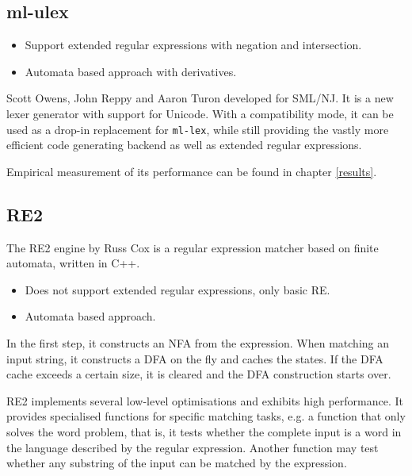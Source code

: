 \subsection{ml-ulex}

\begin{itemize}

   \item Support extended regular expressions with negation and intersection.

   \item Automata based approach with derivatives.

\end{itemize}

Scott Owens, John Reppy and Aaron Turon developed \mlulex{} for SML/NJ. It is a
new lexer generator with support for Unicode. With a compatibility mode, it can
be used as a drop-in replacement for \texttt{ml-lex}, while still providing the
vastly more efficient code generating backend as well as extended regular
expressions.

Empirical measurement of its performance can be found in chapter \ref{results}.


\subsection{RE2}

The RE2 engine by Russ Cox is a regular expression matcher based on finite
automata, written in C++.

\begin{itemize}

   \item Does not support extended regular expressions, only basic RE.

   \item Automata based approach.

\end{itemize}


In the first step, it constructs an NFA from the expression. When matching an
input string, it constructs a DFA on the fly and caches the states.  If the DFA
cache exceeds a certain size, it is cleared and the DFA construction starts
over.

RE2 implements several low-level optimisations and exhibits high performance. It
provides specialised functions for specific matching tasks, e.g. a function that
only solves the word problem, that is, it tests whether the complete input is a
word in the language described by the regular expression. Another function may
test whether any substring of the input can be matched by the expression.

